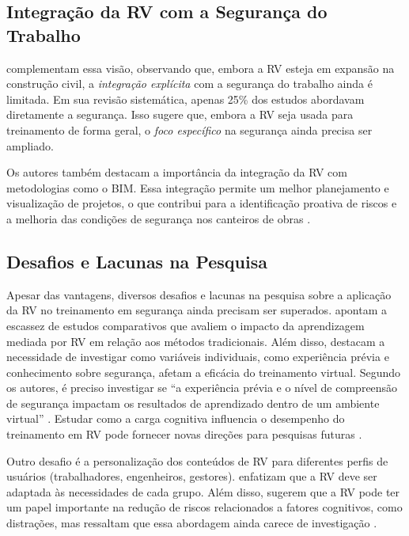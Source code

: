 \subsection{Integração da RV com a Segurança do Trabalho}

 complementam essa visão, observando que, embora a RV esteja em expansão na construção civil, a \textit{integração explícita} com a segurança do trabalho ainda é limitada. Em sua revisão sistemática, apenas 25\% dos estudos abordavam diretamente a segurança. Isso sugere que, embora a RV seja usada para treinamento de forma geral, o \textit{foco específico} na segurança ainda precisa ser ampliado.

Os autores também destacam a importância da integração da RV com metodologias como o \gls{BIM}. Essa integração permite um melhor planejamento e visualização de projetos, o que contribui para a identificação proativa de riscos e a melhoria das condições de segurança nos canteiros de obras \cite[p.~12]{oliveira2024}.

\subsection{Desafios e Lacunas na Pesquisa}

Apesar das vantagens, diversos desafios e lacunas na pesquisa sobre a aplicação da RV no treinamento em segurança ainda precisam ser superados.  apontam a escassez de estudos comparativos que avaliem o impacto da aprendizagem mediada por RV em relação aos métodos tradicionais. Além disso, destacam a necessidade de investigar como variáveis individuais, como experiência prévia e conhecimento sobre segurança, afetam a eficácia do treinamento virtual. Segundo os autores, é preciso investigar se ``a experiência prévia e o nível de compreensão de segurança impactam os resultados de aprendizado dentro de um ambiente virtual'' \cite[p.~13]{akindele2024}. Estudar como a carga cognitiva influencia o desempenho do treinamento em RV pode fornecer novas direções para pesquisas futuras \cite{zhao2015,lucas2018}.

Outro desafio é a personalização dos conteúdos de RV para diferentes perfis de usuários (trabalhadores, engenheiros, gestores).  enfatizam que a RV deve ser adaptada às necessidades de cada grupo. Além disso, sugerem que a RV pode ter um papel importante na redução de riscos relacionados a fatores cognitivos, como distrações, mas ressaltam que essa abordagem ainda carece de investigação \cite[p.~13]{akindele2024}.


